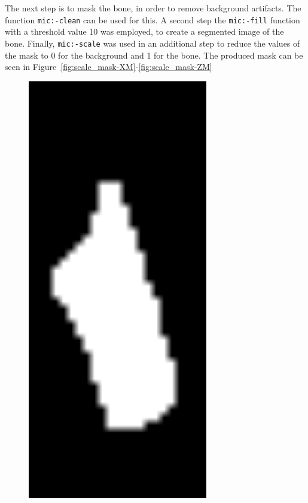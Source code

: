 \documentclass[a4paper,12pt]{article}
\begin{document}
    The next step is to mask the bone, in order to remove background artifacts.
    The function \texttt{mic:-clean} can be used for this.
    A second step the \texttt{mic:-fill} function with a threshold value 10 was employed, to create a segmented image of the bone.
    Finally, \texttt{mic:-scale} was used in an additional step to reduce the values of the mask to 0 for the background and 1 for the bone.
    The produced mask can be seen in Figure~\ref{fig:scale_mask-XM}-\ref{fig:scale_mask-ZM}
    \begin{figure}[htbp]
        \centering
        \begin{minipage}[b]{0.3\textwidth}
            \includegraphics[width=0.7\textwidth]{scale_mask-XM}

\end{minipage}
\end{figure}
\end{document}
